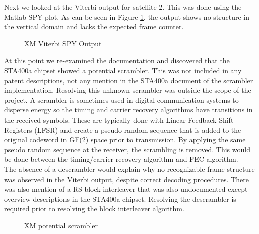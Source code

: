 \documentclass[conference,onecolumn]{IEEEtran}
\begin{document}
Next we looked at the Viterbi output for satellite 2.  This was done using the Matlab SPY plot.  As can be seen in Figure \ref{fig::Viterbi_spy}, the output shows no structure in the vertical domain and lacks the expected frame counter.  
\begin{figure}[H]
	\centerline{}
	\caption{XM Viterbi SPY Output}
	\label{fig::Viterbi_spy}
\end{figure}
At this point we re-examined the documentation and discovered that the STA400a chipset showed a potential scrambler.  This was not included in any patent descriptions, not any mention in the STA400a document of the scrambler implementation.  Resolving this unknown scrambler was outside the scope of the project.  A scrambler is sometimes used in digital communication systems to disperse energy so the timing and carrier recovery algorithms have transitions in the received symbols.  These are typically done with Linear Feedback Shift Registers (LFSR) and create a pseudo random sequence that is added to the original codeword in GF(2) space prior to transmission.  By applying the same pseudo random sequence at the receiver, the scrambling is removed.  This would be done between the timing/carrier recovery algorithm and FEC algorithm.\\

The absence of a descrambler would explain why no recognizable frame structure was observed in the Viterbi output, despite correct decoding procedures.  There was also mention of a RS block interleaver that was also undocumented except overview descriptions in the STA400a chipset.  Resolving the descrambler is required prior to resolving the block interleaver algorithm. 

\begin{figure}[H]
	\centerline{}
	\caption{XM potential scrambler}
	\label{fig::scrambler}
\end{figure}
\end{document}
